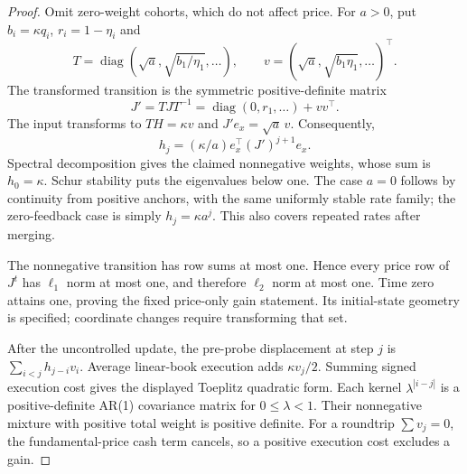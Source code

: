 \begin{proof}
Omit zero-weight cohorts, which do not affect price. For $a>0$, put $b_i=\kappa q_i$, $r_i=1-\eta_i$ and
\[
T=\operatorname{diag}(\sqrt a,\sqrt{b_1/\eta_1},\ldots),\qquad
v=(\sqrt a,\sqrt{b_1\eta_1},\ldots)^\top.
\]
The transformed transition is the symmetric positive-definite matrix
\[
J'=TJT^{-1}=\operatorname{diag}(0,r_1,\ldots)+vv^\top.
\]
The input transforms to $TH=\kappa v$ and $J'e_x=\sqrt a\,v$. Consequently,
\[
h_j=(\kappa/a)e_x^\top(J')^{j+1}e_x.
\]
Spectral decomposition gives the claimed nonnegative weights, whose sum is $h_0=\kappa$. Schur stability puts the eigenvalues below one. The case $a=0$ follows by continuity from positive anchors, with the same uniformly stable rate family; the zero-feedback case is simply $h_j=\kappa a^j$. This also covers repeated rates after merging.

The nonnegative transition has row sums at most one. Hence every price row of $J^t$ has $\ell_1$ norm at most one, and therefore $\ell_2$ norm at most one. Time zero attains one, proving the fixed price-only gain statement. Its initial-state geometry is specified; coordinate changes require transforming that set.

After the uncontrolled update, the pre-probe displacement at step $j$ is $\sum_{i<j}h_{j-i}v_i$. Average linear-book execution adds $\kappa v_j/2$. Summing signed execution cost gives the displayed Toeplitz quadratic form. Each kernel $\lambda^{|i-j|}$ is a positive-definite AR(1) covariance matrix for $0\le\lambda<1$. Their nonnegative mixture with positive total weight is positive definite. For a roundtrip $\sum v_j=0$, the fundamental-price cash term cancels, so a positive execution cost excludes a gain.
\end{proof}

